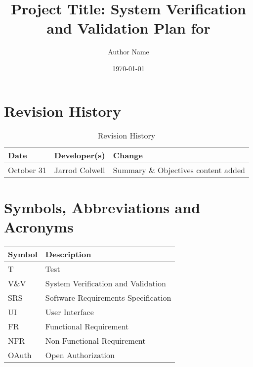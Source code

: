 \documentclass[12pt, titlepage]{article}
\begin{document}
\title{Project Title: System Verification and Validation Plan for \progname{}} 
\author{Author Name}
\date{\today}
	
\maketitle


\section*{Revision History}
\begin{table}[hp]
	\caption{Revision History} \label{TblRevisionHistory}
	\begin{tabularx}{\textwidth}{llX}
		\toprule
		\textbf{Date} & \textbf{Developer(s)} & \textbf{Change}\\
		\midrule
		October 31 & Jarrod Colwell & Summary \& Objectives content added\\
		\bottomrule
	\end{tabularx}
\end{table}

\newpage

\tableofcontents

\listoftables
{}

\listoffigures
{}

\newpage

\section{Symbols, Abbreviations and Acronyms}

\renewcommand{\arraystretch}{1.2}
\begin{tabular}{l | l} 
  \toprule		
  \textbf{Symbol} & \textbf{Description}\\
  \midrule 
  T & Test\\
  V\&V & System Verification and Validation\\
  SRS & Software Requirements Specification\\
  UI & User Interface\\
  FR & Functional Requirement\\
  NFR & Non-Functional Requirement\\
  OAuth & Open Authorization\\
  \bottomrule
\end{tabular}\\
\end{document}
